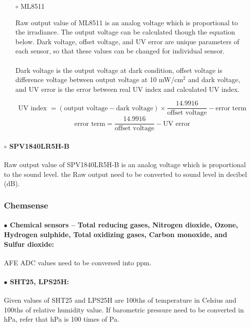 \begin{itemize}
\item[$\circ$] ML8511

Raw output value of ML8511 is an analog voltage which is proportional to the irradiance. The output voltage can be calculated though the equation below.
Dark voltage, offset voltage, and UV error are unique parameters of each sensor, so that these values can be changed for individual sensor.
\\\\
Dark voltage is the output voltage at dark condition, offset voltage is difference voltage between output voltage at 10 mW/cm$^2$ and dark voltage,
and UV error is the error between real UV index and calculated UV index.

\bigbreak

{\centering
 \[ \text{UV index } = \left( \text{output voltage} - \text{dark voltage} \right) \times \frac{14.9916}{\text{offset voltage}} - \text{error term}\]
 \[ \text{error term} = \frac{14.9916}{\text{offset voltage}} - \text{UV error} \]
 \par
 }
 
\end{itemize}

\paragraph{$\circ$ SPV1840LR5H-B}

Raw output value of SPV1840LR5H-B is an analog voltage which is proportional to the sound level.
the Raw output need to be converted to sound level in decibel (dB).
 


\subsubsection{Chemsense}

\paragraph{$\bullet$ Chemical sensors -- Total reducing gases, Nitrogen dioxide, Ozone, Hydrogen sulphide, Total oxidizing gases, Carbon monoxide, and Sulfur dioxide:}
AFE ADC values need to be conversed into ppm.


\paragraph{$\bullet$ SHT25, LPS25H:}
Given values of SHT25 and LPS25H are 100ths of temperature in Celsius and 100ths of relative humidity value.
If barometric pressure need to be converted in hPa, refer that hPa is 100 times of Pa.

